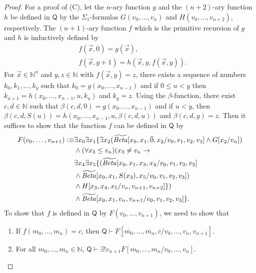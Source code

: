\begin{proof}
For a proof of (C), let the $n$-ary function $g$ and the $(n+2)$-ary function $h$ be defined in $\mathsf{Q}$ by the $\Sigma_1$-formulas $G(v_0, \ldots, v_{n})$ and $H(v_0, \ldots, v_{n+2})$, respectively. The $(n+1)$-ary function $f$ which is the primitive recursion of $g$ and $h$ is inductively defined by 
\begin{align*}
&f(\overrightarrow{x}, 0) = g(\overrightarrow{x}), \\
& f(\overrightarrow{x}, y+1) = h( \overrightarrow{x}, y, f(\overrightarrow{x},y)). 
\end{align*}
For $\overrightarrow{x} \in \mathbb{N}^n$ and $y,z\in \mathbb{N}$ with $f(\overrightarrow{x}, y) = z$, there exists a sequence of numbers $k_0, k_1, \ldots, k_y$ such that $k_0 = g(x_0, \ldots, x_{n-1})$ and if $0\le u<y$ then $k_{u+1} = h(x_0, \ldots, x_{n-1}, u, k_u)$ and $k_y = z$.  Using the $\beta$-function, there exist $c, d \in \mathbb{N}$ such that $\beta(c,d,0) = g(x_0, \ldots, x_{n-1})$ and if $u < y$, then $\beta(c,d,S(u))= h(x_0, \ldots, x_{n-1},u, \beta(c,d,u))$ and $\beta(c,d,y) = z$. Then it suffices to show that the function $f$ can be defined in $\mathsf{Q}$ by
\begin{align*}
F(v_0,\ldots, v_{n+1}) \vcentcolon \equiv &\exists x_0 \exists x_1 \lbrace \exists x_2  (\mathit{\widetilde{Beta}}[x_0,x_1,\overline{0},x_2/v_0,v_1,v_2,v_3] \wedge G[x_2/v_{n}] ) \\
&\wedge ( \forall x_3 \le v_{n} )  ( x_3 \neq v_{n} \rightarrow \\
& \exists x_4 \exists x_5  \lbrace ( \mathit{\widetilde{Beta}}[x_0,x_1,x_3,x_4/v_0,v_1,v_2,v_3] \\
& \wedge \mathit{\widetilde{Beta}}[x_0,x_1,S(x_3),x_5/v_0,v_1,v_2,v_3]) \\
& \wedge H[ x_3, x_4, x_5 / v_{n}, v_{n+1}, v_{n+2}] \rbrace ) \\
& \wedge \mathit{\widetilde{Beta}}[x_0,x_1,v_{n},v_{n+1}/v_0,v_1,v_2,v_3]\rbrace. 
\end{align*}
To show that $f$ is defined in $\mathsf{Q}$ by $F(v_0,\ldots, v_{n+1})$, we need to show that
\begin{enumerate}
\item If $f(m_0, \ldots, m_n) = c$, then $\mathsf{Q} \vdash F[\overline{m_0}, \ldots, \overline{m_n},\overline{c}/v_0, \ldots, v_n,v_{n+1}]$.
\item For all $m_0, \ldots, m_n \in \mathbb{N}$, $\mathsf{Q} \vdash \exists ! v_{n+1} F[m_0, \ldots, m_n/v_0, \ldots, v_n]$.
\end{enumerate}


\end{proof}
